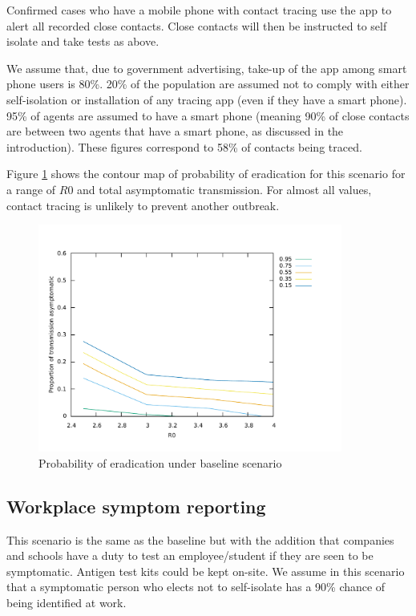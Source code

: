 \documentclass{article}
\begin{document}
Confirmed cases who have a mobile phone with contact tracing use the app to alert all recorded close contacts. Close contacts will then be instructed to self isolate and take tests as above.

We assume that, due to government advertising, take-up of the app among smart phone users is 80\%. 20\% of the population are assumed not to comply with either self-isolation or installation of any tracing app (even if they have a smart phone).  95\% of agents are assumed to have a smart phone (meaning 90\% of close contacts are between two agents that have a smart phone, as discussed in the introduction). These figures correspond to 58\% of contacts being traced.

Figure \ref{baseline} shows the contour map of probability of eradication for this scenario for a range of $R0$ and total asymptomatic transmission. For almost all values, contact tracing is unlikely to prevent another outbreak.

\begin{figure}
\begin{center}
\includegraphics[width = 10cm]{baseline.pdf}
\end{center}
\caption{Probability of eradication under baseline scenario}
\label{baseline}
\end{figure}

\subsection{Workplace symptom reporting}

This scenario is the same as the baseline but with the addition that companies and schools have a duty to test an employee/student if they are seen to be symptomatic. Antigen test kits could be kept on-site. We assume in this scenario that a symptomatic person who elects not to self-isolate has a 90\% chance of being identified at work.
\end{document}
